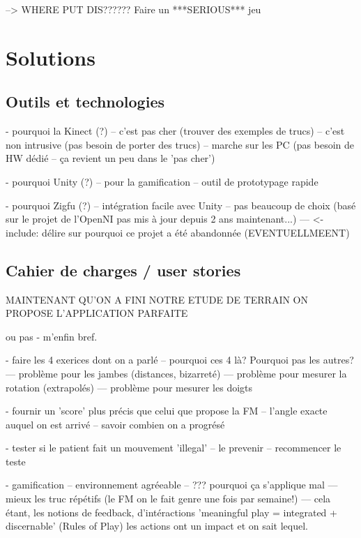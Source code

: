 \documentclass[french,12pt]{report}
\begin{document}
		--> WHERE PUT DIS?????? Faire un ***SERIOUS*** jeu
		
		
		
		\section{Solutions}
		
		\subsection{Outils et technologies} 		%
		

		
		- pourquoi la Kinect (?)
		-- c'est pas cher (trouver des exemples de trucs)
		-- c'est non intrusive (pas besoin de porter des trucs)
		-- marche sur les PC (pas besoin de HW dédié -- ça revient un peu dans le 'pas cher')
		
		- pourquoi Unity (?)
		-- pour la gamification
		-- outil de prototypage rapide
		
		- pourquoi Zigfu (?)
		-- intégration facile avec Unity
		-- pas beaucoup de choix (basé sur le projet de l'OpenNI pas mis à jour depuis 2 ans maintenant...)
		--- <- include: délire sur pourquoi ce projet a été abandonnée (EVENTUELLMEENT)
		
		
		\subsection{Cahier de charges / user stories} 		%
		
		MAINTENANT QU'ON A FINI NOTRE ETUDE DE TERRAIN ON PROPOSE L'APPLICATION PARFAITE 
		
		ou pas - m'enfin bref.
		
		- faire les 4 exerices dont on a parlé
		-- pourquoi ces 4 là? Pourquoi pas les autres?
		--- problème pour les jambes (distances, bizarreté)
		--- problème pour mesurer la rotation (extrapolés)
		--- problème pour mesurer les doigts 
		
		- fournir un 'score' plus précis que celui que propose la FM
		-- l'angle exacte auquel on est arrivé
		-- savoir combien on a progrésé
		
		- tester si le patient fait un mouvement 'illegal'
		-- le prevenir
		-- recommencer le teste
		
		
		- gamification
		-- environnement agréeable
		-- ??? pourquoi ça s'applique mal
		--- mieux les truc répétifs (le FM on le fait genre une fois par semaine!)
		--- cela étant, les notions de feedback, d'intéractions 
			'meaningful play = integrated + discernable' (Rules of Play) les actions ont un 
			impact et on sait lequel. 
		
\end{document}
